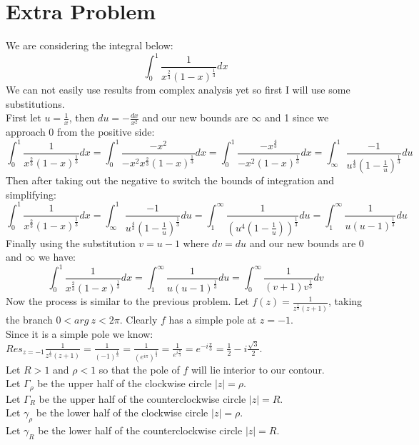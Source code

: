 \documentclass{article}
\begin{document}
\section*{Extra Problem}
\begin{center}
    \doublespacing
    We are considering the integral below:
    \[\int _0^1\frac{1}{x^{\frac{2}{3}}(1-x)^{\frac{1}{3}}} dx\]
    We can not easily use results from complex analysis yet so first I will use some substitutions.
    \\First let $u =\frac{1}{x}$, then $du = -\frac{dx}{x^2}$ and our new bounds are $\infty$ and 1 since we approach 0 from the positive side:
    \[\int _0^1\frac{1}{x^{\frac{2}{3}}(1-x)^{\frac{1}{3}}} dx =\int _0^1\frac{-x^2}{-x^2 x^{\frac{2}{3}}(1-x)^{\frac{1}{3}}} dx =\int _0^1\frac{-x^{\frac{4}{3}}}{-x^2(1-x)^{\frac{1}{3}}} dx =\int _{\infty}^1\frac{-1}{u^{\frac{4}{3}}(1 -\frac{1}{u})^{\frac{1}{3}}} du\]
    Then after taking out the negative to switch the bounds of integration and simplifying:
    \[\int _0^1\frac{1}{x^{\frac{2}{3}}(1-x)^{\frac{1}{3}}} dx =\int _{\infty}^1\frac{-1}{u^{\frac{4}{3}}(1 -\frac{1}{u})^{\frac{1}{3}}} du =\int _1^{\infty}\frac{1}{(u^4(1 -\frac{1}{u}))^{\frac{1}{3}}} du =\int _1^{\infty}\frac{1}{u(u - 1)^{\frac{1}{3}}} du\]
    Finally using the substitution $v = u - 1$ where $dv = du$ and our new bounds are 0 and $\infty$ we have:
    \[\int _0^1\frac{1}{x^{\frac{2}{3}}(1-x)^{\frac{1}{3}}} dx =\int _1^{\infty}\frac{1}{u(u - 1)^{\frac{1}{3}}} du =\int _0^{\infty}\frac{1}{(v+1)v^{\frac{1}{3}}} dv\]
    Now the process is similar to the previous problem.
    \break
    Let $f(z) =\frac{1}{z^{\frac{1}{3}}(z + 1)}$, taking the branch $0 < arg\:z < 2\pi$. Clearly $f$ has a simple pole at $z = -1$.
    \\Since it is a simple pole we know:
    \\$Res_{z = -1}\frac{1}{z^{\frac{1}{3}}(z + 1)} =\frac{1}{(-1)^{\frac{1}{3}}} =\frac{1}{(e^{i\pi})^{\frac{1}{3}}} =\frac{1}{e^{i\frac{\pi}{3}}} = e^{-i\frac{\pi}{3}} =\frac{1}{2} - i\frac{\sqrt{3}}{2}$.
    \\Let $R > 1$ and $\rho < 1$ so that the pole of $f$ will lie interior to our contour.
    \\Let $\Gamma _{\rho}$ be the upper half of the clockwise circle $|z| =\rho$.
    \\Let $\Gamma _R$ be the upper half of the counterclockwise circle $|z| = R$.
    \\Let $\gamma _{\rho}$ be the lower half of the clockwise circle $|z| =\rho$.
    \\Let $\gamma _R$ be the lower half of the counterclockwise circle $|z| = R$.

\end{center}
\end{document}
